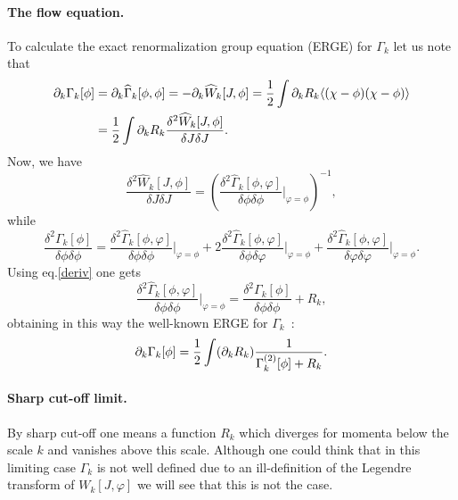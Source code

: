 \documentclass[a4paper,12pt]{article}
\begin{document}
\paragraph{The flow equation.} To calculate the exact renormalization group equation (ERGE) for $\Gamma_k$ let us note that
\begin{equation}\begin{split}
                 \partial_k \Gamma_k[\phi] & =\partial_k \widehat{\Gamma}_k[\phi,\phi] = - \partial_k \widehat{W}_k [J,\phi] =\frac{1}{2}\int\partial_k R_k \langle (\chi-\phi)(\chi-\phi)\rangle\\
          & = \frac{1}{2}\int\partial_k R_k\frac{\delta^2 \widehat{W}_k[J,\phi]}{\delta J\delta J}.
\end{split}\end{equation}
Now, we have
\begin{equation}
             \frac{\delta^2 \widehat{W}_k[J,\phi]}{\delta J\delta J}=\left( \frac{\delta^2 \widehat{\Gamma}_k[\phi,\varphi]}{\delta\phi\delta\phi} {\Big |}_{\varphi=\phi}\right)^{-1},
\end{equation}
while
\begin{equation}
           \frac{\delta^2 \Gamma_k[\phi]}{\delta\phi\delta\phi}= \frac{\delta^2 \widehat{\Gamma}_k[\phi,\varphi]}{\delta\phi\delta\phi}{\Big |}_{\varphi=\phi} + 2 \frac{\delta^2 \widehat{\Gamma}_k[\phi,\varphi]}{\delta\phi\delta\varphi}{\Big |}_{\varphi=\phi} + \frac{\delta^2 \widehat{\Gamma}_k[\phi,\varphi]}{\delta\varphi\delta\varphi}{\Big |}_{\varphi=\phi}.
\end{equation}
Using eq.\eqref{deriv} one gets
\begin{equation}
           \frac{\delta^2 \widehat{\Gamma}_k[\phi,\varphi]}{\delta\phi\delta\phi}{\Big |}_{\varphi=\phi}= \frac{\delta^2 \Gamma_k[\phi]}{\delta\phi\delta\phi} + R_k,
\end{equation}
obtaining in this way the well-known ERGE for $\Gamma_k$~\cite{wet93,bon93}:
\begin{equation}\label{floweq}
           \partial_k \Gamma_k[\phi] = \frac{1}{2}\int(\partial_k R_k)\frac{1}{\Gamma_k^{(2)}[\phi] + R_k}.
\end{equation}

\paragraph{Sharp cut-off limit.} By sharp cut-off one means a function $R_k$ which diverges for momenta below the scale $k$ and vanishes above this scale. Although one could think that in this limiting case $\Gamma_k$ is not well defined due to an ill-definition of the Legendre transform of $W_k[J,\varphi]$ we will see that this is not the case. 
\end{document}
